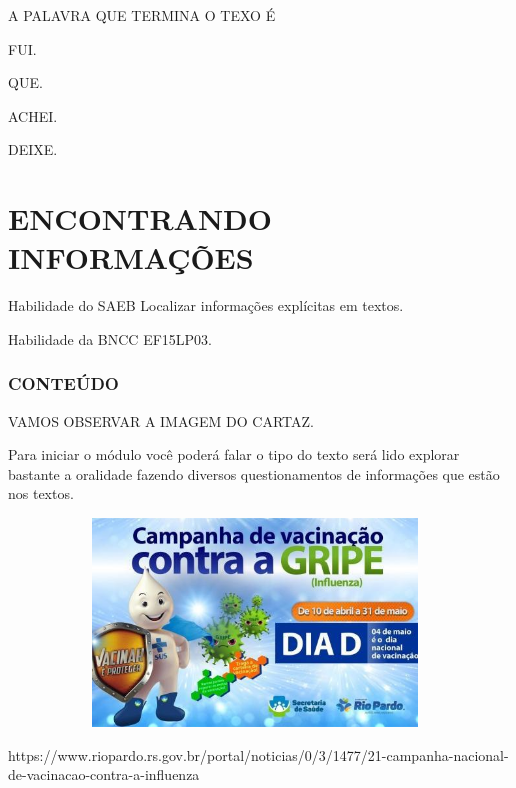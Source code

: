 \begin{escola}
A PALAVRA QUE TERMINA O TEXO É

\begin{escolha}
\item FUI.

\item QUE.

\item ACHEI.

\item DEIXE.
\end{escolha}


\chapter{ENCONTRANDO INFORMAÇÕES}

\protect\hypertarget{_heading=h.lnxbz9}{}{}Habilidade do SAEB 
Localizar informações explícitas em textos.

Habilidade da BNCC 
EF15LP03.

\subsection{CONTEÚDO}\label{conteuxfado-2}

VAMOS OBSERVAR A IMAGEM DO CARTAZ.

\protect\hypertarget{_heading=h.35nkun2}{}{}Para iniciar o módulo você
poderá falar o tipo do texto será lido explorar bastante a oralidade
fazendo diversos questionamentos de informações que estão nos textos.

\includegraphics[width=5.14986in,height=2.17762in]{media/image124.jpg}

https://www.riopardo.rs.gov.br/portal/noticias/0/3/1477/21-campanha-nacional-de-vacinacao-contra-a-influenza


\end{escola}
